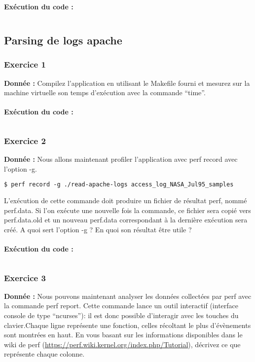 \textbf{Exécution du code : } \\
\begin{lstlisting}

\end{lstlisting}

\subsection{Parsing de logs apache}
\subsubsection{Exercice 1}
\textbf{Donnée : } Compilez	l'application	en	utilisant	le	Makefile	fourni	et	mesurez sur	la	machine	virtuelle son	temps	
d'exécution	avec	la	commande	“time”.\\\\

\textbf{Exécution du code : } \\
\begin{lstlisting}

\end{lstlisting}

\subsubsection{Exercice 2}
\textbf{Donnée : } Nous	allons	maintenant	profiler	l'application	avec	perf	record	avec	l'option	-g.
\begin{lstlisting}
$ perf record -g ./read-apache-logs access_log_NASA_Jul95_samples
\end{lstlisting}
L'exécution	de	cette	commande	doit	produire	un	fichier	de	résultat	perf,	nommé	perf.data.	Si	l'on	
exécute	une	nouvelle	fois	la	commande,	ce	fichier	sera	copié	vers	perf.data.old et	un	nouveau	
perf.data	correspondant	à	la	dernière	exécution	sera	créé.
A	quoi	sert	l'option	-g	?	En	quoi	son	résultat	être	utile	?\\\\

\textbf{Exécution du code : } \\
\begin{lstlisting}

\end{lstlisting}

\subsubsection{Exercice 3}
\textbf{Donnée : } Nous	pouvons	maintenant	analyser	les	données	collectées	par	perf	avec	la	commande	perf	report.	
Cette	commande	lance	un	outil	interactif	(interface	console de	type	“ncurses”):	il	est	donc	possible	
d'interagir avec	les	touches	du	clavier.Chaque	ligne	représente	une	fonction,	celles	récoltant	le	plus	d'évènements	sont	montrées	en	haut.	
En	vous	basant sur	les	informations	disponibles	dans	le	wiki	de	perf	
(\url{https://perf.wiki.kernel.org/index.php/Tutorial}),	décrivez	ce	que	représente	chaque	colonne.\\\\

